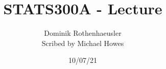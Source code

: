 




\title{STATS300A - Lecture }
\author{Dominik Rothenhaeusler\\ Scribed by Michael Howes}
\date{10/07/21}

\pagestyle{fancy}
\fancyhf{}


\maketitle
\tableofcontents
